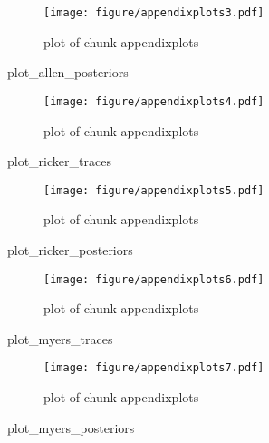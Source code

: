 \documentclass[author-year, review]{elsarticle} %
\makeatletter
\newenvironment{Shaded}{}{}
\newcommand{\NormalTok}[1]{{#1}}
\def\maxwidth{\ifdim\Gin@nat@width>\linewidth\linewidth
\else\Gin@nat@width\fi}
\let\Oldincludegraphics\includegraphics
\renewcommand{\includegraphics}[1]{\Oldincludegraphics[width=\maxwidth]{#1}}
\makeatother
\begin{document}
\begin{figure}[htbp]
\centering
\texttt{[image: figure/appendixplots3.pdf]}
\caption{plot of chunk appendixplots}
\end{figure}

\begin{Shaded}
\begin{Highlighting}[]
\NormalTok{plot_allen_posteriors}
\end{Highlighting}
\end{Shaded}

\begin{figure}[htbp]
\centering
\texttt{[image: figure/appendixplots4.pdf]}
\caption{plot of chunk appendixplots}
\end{figure}

\begin{Shaded}
\begin{Highlighting}[]
\NormalTok{plot_ricker_traces}
\end{Highlighting}
\end{Shaded}

\begin{figure}[htbp]
\centering
\texttt{[image: figure/appendixplots5.pdf]}
\caption{plot of chunk appendixplots}
\end{figure}

\begin{Shaded}
\begin{Highlighting}[]
\NormalTok{plot_ricker_posteriors}
\end{Highlighting}
\end{Shaded}

\begin{figure}[htbp]
\centering
\texttt{[image: figure/appendixplots6.pdf]}
\caption{plot of chunk appendixplots}
\end{figure}

\begin{Shaded}
\begin{Highlighting}[]
\NormalTok{plot_myers_traces}
\end{Highlighting}
\end{Shaded}

\begin{figure}[htbp]
\centering
\texttt{[image: figure/appendixplots7.pdf]}
\caption{plot of chunk appendixplots}
\end{figure}

\begin{Shaded}
\begin{Highlighting}[]
\NormalTok{plot_myers_posteriors}
\end{Highlighting}
\end{Shaded}
\end{document}

